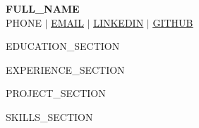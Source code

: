 \documentclass[letterpaper,11pt]{article}
\begin{document}
\begin{center}
    \textbf{\Huge \scshape {{FULL_NAME}}} \\ \vspace{1pt}
    \small {{PHONE}} $|$ \href{mailto:{{EMAIL}}}{\underline{{{EMAIL}}}} $|$ 
    \href{https://{{LINKEDIN}}}{\underline{{{LINKEDIN}}}} $|$
    \href{https://{{GITHUB}}}{\underline{{{GITHUB}}}}
\end{center}

{{EDUCATION_SECTION}}

{{EXPERIENCE_SECTION}}

{{PROJECT_SECTION}}

{{SKILLS_SECTION}}

\end{document}

